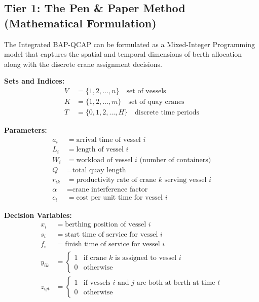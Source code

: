\documentclass{article}
\begin{document}
\subsection{Tier 1: The Pen \& Paper Method (Mathematical Formulation)}

The Integrated BAP-QCAP can be formulated as a Mixed-Integer Programming model that captures the spatial and temporal dimensions of berth allocation along with the discrete crane assignment decisions.

\textbf{Sets and Indices:}
\begin{align}
V &= \{1, 2, \ldots, n\} \quad \text{set of vessels} \\
K &= \{1, 2, \ldots, m\} \quad \text{set of quay cranes} \\
T &= \{0, 1, 2, \ldots, H\} \quad \text{discrete time periods}
\end{align}

\textbf{Parameters:}
\begin{align}
a_i &= \text{arrival time of vessel } i \\
L_i &= \text{length of vessel } i \\
W_i &= \text{workload of vessel } i \text{ (number of containers)} \\
Q &= \text{total quay length} \\
r_{ik} &= \text{productivity rate of crane } k \text{ serving vessel } i \\
\alpha &= \text{crane interference factor} \\
c_i &= \text{cost per unit time for vessel } i
\end{align}

\textbf{Decision Variables:}
\begin{align}
x_i &= \text{berthing position of vessel } i \\
s_i &= \text{start time of service for vessel } i \\
f_i &= \text{finish time of service for vessel } i \\
y_{ik} &= \begin{cases} 1 & \text{if crane } k \text{ is assigned to vessel } i \\ 0 & \text{otherwise} \end{cases} \\
z_{ijt} &= \begin{cases} 1 & \text{if vessels } i \text{ and } j \text{ are both at berth at time } t \\ 0 & \text{otherwise} \end{cases}
\end{align}
\end{document}
